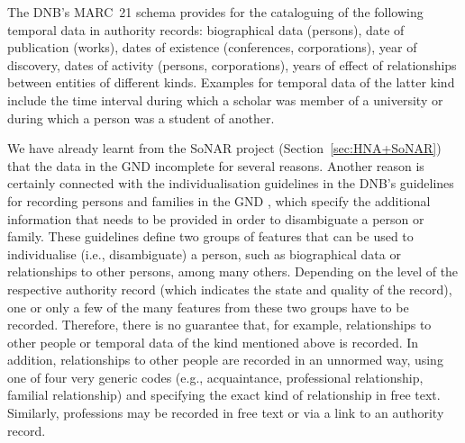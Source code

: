 The DNB's MARC~21 schema \autocite{DNB_MARC21}
provides for the cataloguing of the following temporal data in authority records:
biographical data (persons), date of publication (works), dates of existence (conferences, corporations),
year of discovery, dates of activity (persons, corporations), years of effect of relationships
between entities of different kinds. Examples for temporal data of the latter kind include
the time interval during which a scholar was member of a university or during which a person was a student of another.

We have already learnt from the \gls{SoNAR} project (Section~\ref{sec:HNA+SoNAR}) 
that the data in the GND incomplete for several reasons.
Another reason is certainly connected with the individualisation guidelines
in the DNB's guidelines for recording persons and families in the GND
\autocite[part EH-P-16]{GND_Erfassungshilfen}, which specify the additional information
that needs to be provided in order to disambiguate a person or family.
These guidelines define two groups of features that can be used to individualise
(i.e., disambiguate) a person, such as biographical data or relationships to other persons, among many others.
Depending on the level of the respective authority record
(which indicates the state and quality of the record), one or only a few of the many features
from these two groups have to be recorded.
Therefore, there is no guarantee that, for example, relationships to other people
or temporal data of the kind mentioned above is recorded.
In addition, relationships to other people are recorded in an unnormed way,
using one of four very generic codes (e.g., acquaintance, professional relationship, familial relationship)
and specifying the exact kind of relationship in free text.
Similarly, professions may be recorded in free text or via a link to an authority record.


%
%

